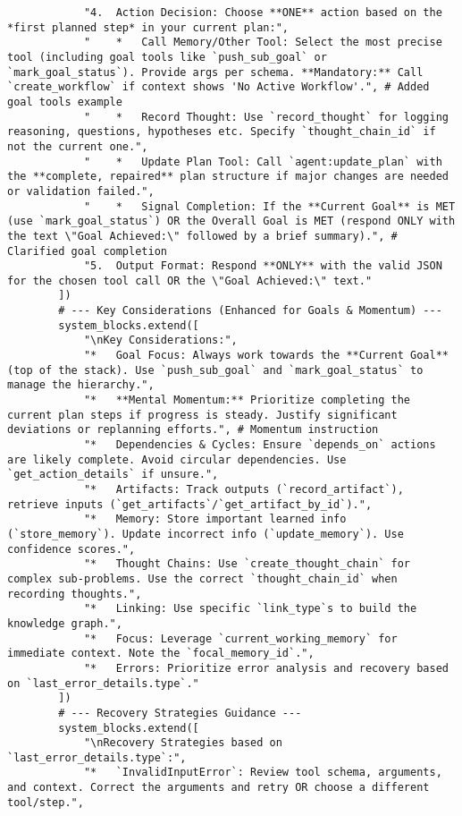 \documentclass[12pt,a4paper]{article}
\begin{document}
\begin{pageablecode}
\begin{verbatim}
            "4.  Action Decision: Choose **ONE** action based on the *first planned step* in your current plan:",
            "    *   Call Memory/Other Tool: Select the most precise tool (including goal tools like `push_sub_goal` or `mark_goal_status`). Provide args per schema. **Mandatory:** Call `create_workflow` if context shows 'No Active Workflow'.", # Added goal tools example
            "    *   Record Thought: Use `record_thought` for logging reasoning, questions, hypotheses etc. Specify `thought_chain_id` if not the current one.",
            "    *   Update Plan Tool: Call `agent:update_plan` with the **complete, repaired** plan structure if major changes are needed or validation failed.",
            "    *   Signal Completion: If the **Current Goal** is MET (use `mark_goal_status`) OR the Overall Goal is MET (respond ONLY with the text \"Goal Achieved:\" followed by a brief summary).", # Clarified goal completion
            "5.  Output Format: Respond **ONLY** with the valid JSON for the chosen tool call OR the \"Goal Achieved:\" text."
        ])
        # --- Key Considerations (Enhanced for Goals & Momentum) ---
        system_blocks.extend([
            "\nKey Considerations:",
            "*   Goal Focus: Always work towards the **Current Goal** (top of the stack). Use `push_sub_goal` and `mark_goal_status` to manage the hierarchy.",
            "*   **Mental Momentum:** Prioritize completing the current plan steps if progress is steady. Justify significant deviations or replanning efforts.", # Momentum instruction
            "*   Dependencies & Cycles: Ensure `depends_on` actions are likely complete. Avoid circular dependencies. Use `get_action_details` if unsure.",
            "*   Artifacts: Track outputs (`record_artifact`), retrieve inputs (`get_artifacts`/`get_artifact_by_id`).",
            "*   Memory: Store important learned info (`store_memory`). Update incorrect info (`update_memory`). Use confidence scores.",
            "*   Thought Chains: Use `create_thought_chain` for complex sub-problems. Use the correct `thought_chain_id` when recording thoughts.",
            "*   Linking: Use specific `link_type`s to build the knowledge graph.",
            "*   Focus: Leverage `current_working_memory` for immediate context. Note the `focal_memory_id`.",
            "*   Errors: Prioritize error analysis and recovery based on `last_error_details.type`."
        ])
        # --- Recovery Strategies Guidance ---
        system_blocks.extend([
            "\nRecovery Strategies based on `last_error_details.type`:",
            "*   `InvalidInputError`: Review tool schema, arguments, and context. Correct the arguments and retry OR choose a different tool/step.",

\end{verbatim}
\end{pageablecode}
\end{document}
